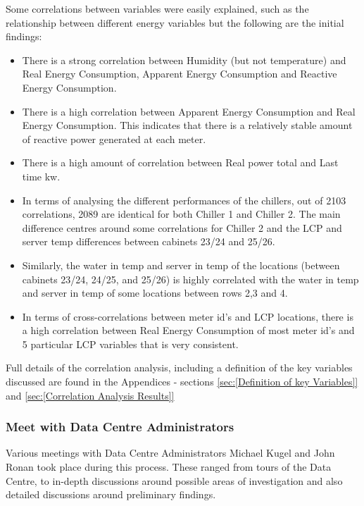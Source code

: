 \documentclass[12pt]{scrartcl}
\begin{document}
Some correlations between variables were easily explained, such as the relationship between different energy variables but the following are the initial findings:    

\begin{itemize}
\item There is a strong correlation between Humidity (but not temperature) and Real Energy Consumption, Apparent Energy Consumption and Reactive Energy Consumption.
\item There is a high correlation between Apparent Energy Consumption and Real Energy Consumption. This indicates that there is a relatively stable amount of reactive power generated at each meter.
\item There is a high amount of correlation between Real power total and Last time kw.
\item In terms of analysing the different performances of the chillers, out of 2103 correlations, 2089 are identical for both Chiller 1 and Chiller 2. The main difference centres around some correlations for Chiller 2 and the \gls{LCP} and server temp differences between cabinets 23/24 and 25/26.
\item Similarly, the water in temp and server in temp of the locations (between cabinets 23/24, 24/25, and 25/26) is highly correlated with the water in temp and server in temp of some locations between rows 2,3 and 4.
\item In terms of cross-correlations between meter id’s and LCP locations, there is a high correlation between Real Energy Consumption of most meter id’s and 5 particular \gls{LCP} variables that is very consistent.
\end{itemize}  

Full details of the correlation analysis, including a definition of the key variables discussed are found in the Appendices - sections \ref{sec:[Definition of key Variables]} and \ref{sec:[Correlation Analysis Results]}

\subsubsection{Meet with Data Centre Administrators}
\label{subsubsec:[Meet with Data Centre Administrators]}

Various meetings with Data Centre Administrators Michael Kugel and John Ronan took place during this process. These ranged from tours of the Data Centre, to in-depth discussions around possible areas of investigation and also detailed discussions around preliminary findings. 
\end{document}

